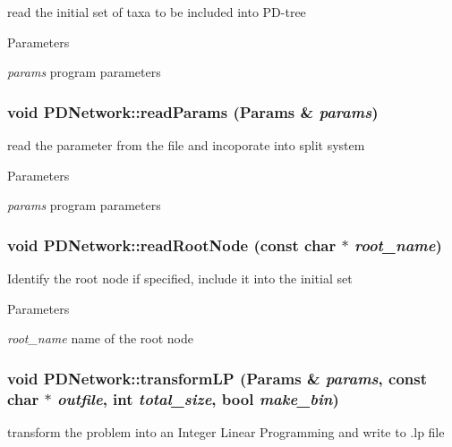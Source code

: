 \label{classPDNetwork_ad228e5aa31704ab00b4689bcde67551c}
read the initial set of taxa to be included into PD-\/tree 
\begin{DoxyParams}{Parameters}
\item[{\em params}]program parameters \end{DoxyParams}
\hypertarget{classPDNetwork_ab220164dcf5705a35884005476488262}{
\subsubsection[{readParams}]{\setlength{\rightskip}{0pt plus 5cm}void PDNetwork::readParams ({\bf Params} \& {\em params})}}
\label{classPDNetwork_ab220164dcf5705a35884005476488262}
read the parameter from the file and incoporate into split system 
\begin{DoxyParams}{Parameters}
\item[{\em params}]program parameters \end{DoxyParams}
\hypertarget{classPDNetwork_a9a178e8280d5fc19f40b15903fc08320}{
\subsubsection[{readRootNode}]{\setlength{\rightskip}{0pt plus 5cm}void PDNetwork::readRootNode (const char $\ast$ {\em root\_\-name})}}
\label{classPDNetwork_a9a178e8280d5fc19f40b15903fc08320}
Identify the root node if specified, include it into the initial set 
\begin{DoxyParams}{Parameters}
\item[{\em root\_\-name}]name of the root node \end{DoxyParams}
\hypertarget{classPDNetwork_aab6e6faf6c987ce8a4c5780b02774503}{
\subsubsection[{transformLP}]{\setlength{\rightskip}{0pt plus 5cm}void PDNetwork::transformLP ({\bf Params} \& {\em params}, \/  const char $\ast$ {\em outfile}, \/  int {\em total\_\-size}, \/  bool {\em make\_\-bin})}}
\label{classPDNetwork_aab6e6faf6c987ce8a4c5780b02774503}
transform the problem into an Integer Linear Programming and write to .lp file 
